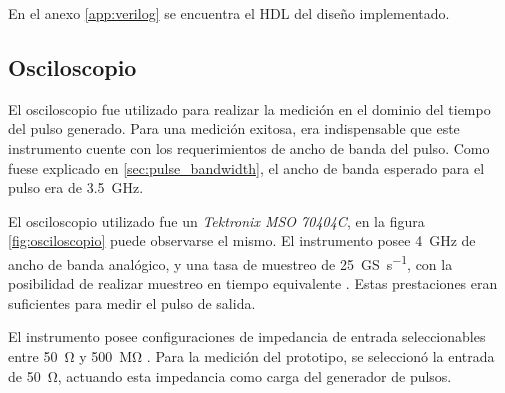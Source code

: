 En el anexo \ref{app:verilog} se encuentra el HDL del diseño implementado.

\subsection{Osciloscopio}

El osciloscopio fue utilizado para realizar la medición en el dominio del tiempo
del pulso generado. Para una medición exitosa, era indispensable que este
instrumento cuente con los requerimientos de ancho de banda del pulso. Como
fuese explicado en \ref{sec:pulse_bandwidth}, el ancho de banda esperado para el
pulso era de \qty{3.5}{\giga\hertz}.

El osciloscopio utilizado fue un \textit{Tektronix MSO 70404C}, en la figura 
\ref{fig:osciloscopio} puede observarse el mismo. El instrumento posee 
\qty{4}{\giga\hertz} de ancho de banda analógico, y una tasa de muestreo
de \qty[per-mode=symbol]{25}{\giga\siemens\per\second}, con la posibilidad de
realizar muestreo en tiempo equivalente \cite{oscilloscope_datasheet}. Estas
prestaciones eran suficientes para medir el pulso de salida.

El instrumento posee configuraciones de impedancia de entrada seleccionables entre
\qty{50}{\ohm} y \qty{500}{\mega\ohm} \cite{oscilloscope_datasheet}. Para la
medición del prototipo, se seleccionó la entrada de \qty{50}{\ohm}, actuando
esta impedancia como carga del generador de pulsos.


